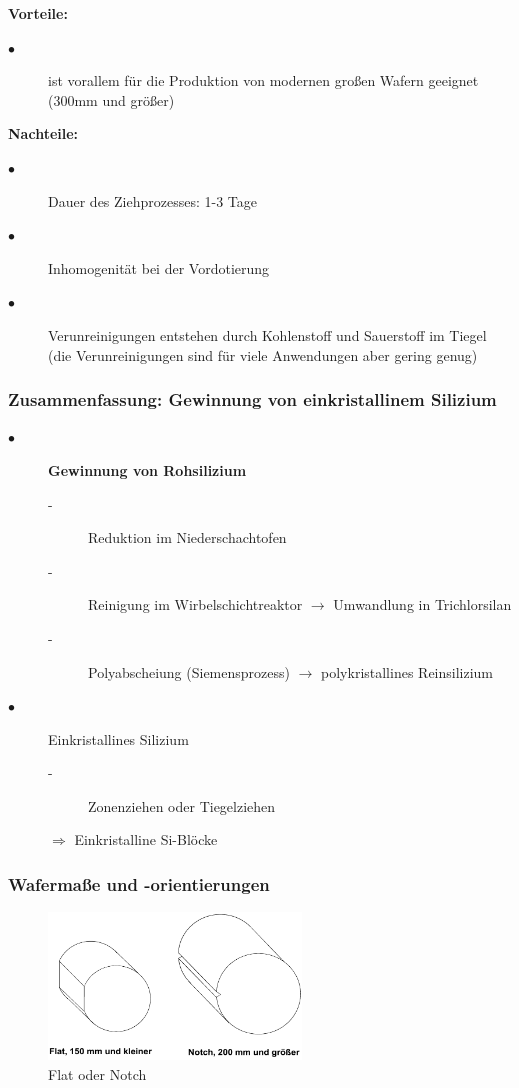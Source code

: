 		\textbf{Vorteile:}
		\begin{description}
			\item[$\bullet$] ist vorallem für die Produktion von modernen großen Wafern geeignet (300mm und größer)
		\end{description}
		\textbf{Nachteile:}
		\begin{description}
			\item[$\bullet$] Dauer des Ziehprozesses: 1-3 Tage
			\item[$\bullet$] Inhomogenität bei der Vordotierung
			\item[$\bullet$] Verunreinigungen entstehen durch Kohlenstoff und Sauerstoff im Tiegel (die Verunreinigungen sind für viele Anwendungen aber gering genug)
		\end{description}
		
	\subsubsection{Zusammenfassung: Gewinnung von einkristallinem Silizium}
		\begin{description}
			\item[$\bullet$] \textbf{Gewinnung von Rohsilizium}
			\begin{description}
				\item[-] Reduktion im Niederschachtofen
				\item[-] Reinigung im Wirbelschichtreaktor $\rightarrow$ Umwandlung in Trichlorsilan
				\item[-] Polyabscheiung (Siemensprozess) $\rightarrow$ polykristallines Reinsilizium
			\end{description}
			\item[$\bullet$]Einkristallines Silizium
			\begin{description}
				\item[-] Zonenziehen oder Tiegelziehen
			\end{description}
			$\Rightarrow$ Einkristalline Si-Blöcke
		\end{description}
		
	\subsubsection{Wafermaße und -orientierungen}
		\begin{figure}[h!]
			\centering
			\includegraphics[width=0.6\textwidth]{Kapitel/Kap02/wafermasse.PNG}
			\caption{Flat oder Notch}
			\label{02_flat_notch}
		\end{figure}
		
